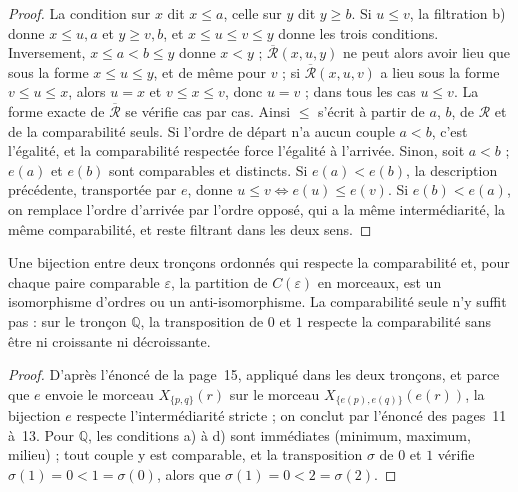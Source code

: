 \begin{proof}
La condition sur $x$ dit $x \leq a$, celle sur $y$ dit $y \geq b$. Si $u \leq v$, la filtration b) donne $x \leq u, a$ et $y \geq v, b$, et $x \leq u \leq v \leq y$ donne les trois conditions. Inversement, $x \leq a < b \leq y$ donne $x < y$ ; $\overline{\mathcal R}(x,u,y)$ ne peut alors avoir lieu que sous la forme $x \leq u \leq y$, et de même pour $v$ ; si $\overline{\mathcal R}(x,u,v)$ a lieu sous la forme $v \leq u \leq x$, alors $u = x$ et $v \leq x \leq v$, donc $u = v$ ; dans tous les cas $u \leq v$. La forme exacte de $\overline{\mathcal R}$ se vérifie cas par cas. Ainsi $\leq$ s'écrit à partir de $a$, $b$, de $\mathcal R$ et de la comparabilité seuls. Si l'ordre de départ n'a aucun couple $a < b$, c'est l'égalité, et la comparabilité respectée force l'égalité à l'arrivée. Sinon, soit $a < b$ ; $e(a)$ et $e(b)$ sont comparables et distincts. Si $e(a) < e(b)$, la description précédente, transportée par $e$, donne $u \leq v \Leftrightarrow e(u) \leq e(v)$. Si $e(b) < e(a)$, on remplace l'ordre d'arrivée par l'ordre opposé, qui a la même intermédiarité, la même comparabilité, et reste filtrant dans les deux sens.
\end{proof}

\begin{encadre}
\begin{theoreme}
Une bijection entre deux tronçons ordonnés qui respecte la comparabilité et, pour chaque paire comparable $\varepsilon$, la partition de $C(\varepsilon)$ en morceaux, est un isomorphisme d'ordres ou un anti-isomorphisme. La comparabilité seule n'y suffit pas : sur le tronçon $\mathbb Q$, la transposition de $0$ et $1$ respecte la comparabilité sans être ni croissante ni décroissante.
\end{theoreme}
\end{encadre}

\begin{proof}
D'après l'énoncé de la page~15, appliqué dans les deux tronçons, et parce que $e$ envoie le morceau $X_{\{p,q\}}(r)$ sur le morceau $X_{\{e(p),e(q)\}}(e(r))$, la bijection $e$ respecte l'intermédiarité stricte ; on conclut par l'énoncé des pages~11 à~13. Pour $\mathbb Q$, les conditions a) à d) sont immédiates (minimum, maximum, milieu) ; tout couple y est comparable, et la transposition $\sigma$ de $0$ et $1$ vérifie $\sigma(1) = 0 < 1 = \sigma(0)$, alors que $\sigma(1) = 0 < 2 = \sigma(2)$.
\end{proof}


